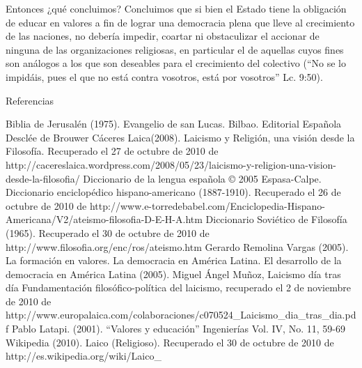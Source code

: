 Entonces ¿qué concluimos? Concluimos que si bien el Estado tiene la obligación de educar en valores a fin de lograr una democracia plena que lleve al crecimiento de las naciones, no debería impedir, coartar ni obstaculizar el accionar de ninguna de las organizaciones religiosas, en particular el de aquellas cuyos fines son análogos a los que son deseables para el crecimiento del colectivo (“No se lo impidáis, pues el que no está contra vosotros, está por vosotros” Lc. 9:50).

Referencias

Biblia de Jerusalén (1975). Evangelio de san Lucas. Bilbao. Editorial Española Desclée de Brouwer
Cáceres Laica(2008). Laicismo y Religión, una visión desde la Filosofía. Recuperado el 27 de octubre de 2010 de http://cacereslaica.wordpress.com/2008/05/23/laicismo-y-religion-una-vision-desde-la-filosofia/
Diccionario de la lengua española © 2005 Espasa-Calpe.
Diccionario enciclopédico hispano-americano (1887-1910). Recuperado el 26 de octubre de 2010 de http://www.e-torredebabel.com/Enciclopedia-Hispano-Americana/V2/ateismo-filosofia-D-E-H-A.htm
Diccionario Soviético de Filosofía (1965). Recuperado el 30 de octubre de 2010 de http://www.filosofia.org/enc/ros/ateismo.htm
Gerardo Remolina Vargas (2005). La formación en valores.
La democracia en América Latina. El desarrollo de la democracia en América Latina (2005).
Miguel Ángel Muñoz, Laicismo día tras día Fundamentación filosófico-política del laicismo, recuperado el 2 de noviembre de 2010 de http://www.europalaica.com/colaboraciones/c070524_Laicismo_dia_tras_dia.pdf
Pablo Latapi. (2001). “Valores y educación” Ingenierías Vol. IV, No. 11, 59-69
Wikipedia (2010). Laico (Religioso). Recuperado el 30 de octubre de 2010 de http://es.wikipedia.org/wiki/Laico_%
